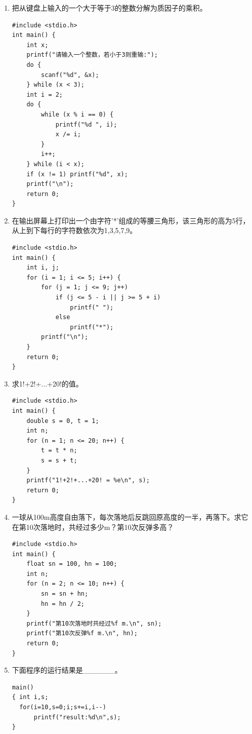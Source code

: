 \documentclass[a4paper,12pt]{article}
\begin{document}
\begin{enumerate}
	\item 把从键盘上输入的一个大于等于3的整数分解为质因子的乘积。
	      \begin{verbatim}
#include <stdio.h>
int main() {
    int x;
    printf("请输入一个整数，若小于3则重输:");
    do {
        scanf("%d", &x);
    } while (x < 3);
    int i = 2;
    do {
        while (x % i == 0) {
            printf("%d ", i);
            x /= i;
        }
        i++;
    } while (i < x);
    if (x != 1) printf("%d", x);
    printf("\n");
    return 0;
}
    \end{verbatim}
	      \vspace{0.3cm}

	\item 在输出屏幕上打印出一个由字符'*'组成的等腰三角形，该三角形的高为5行，从上到下每行的字符数依次为1,3,5,7,9。
	      \begin{verbatim}
#include <stdio.h>
int main() {
    int i, j;
    for (i = 1; i <= 5; i++) {
        for (j = 1; j <= 9; j++)
            if (j <= 5 - i || j >= 5 + i)
                printf(" ");
            else
                printf("*");
        printf("\n");
    }
    return 0;
}
    \end{verbatim}
	      \vspace{0.3cm}

	\item 求1!+2!+...+20!的值。
	      \begin{verbatim}
#include <stdio.h>
int main() {
    double s = 0, t = 1;
    int n;
    for (n = 1; n <= 20; n++) {
        t = t * n;
        s = s + t;
    }
    printf("1!+2!+...+20! = %e\n", s);
    return 0;
}
    \end{verbatim}
	      \vspace{0.3cm}

	\item 一球从100m高度自由落下，每次落地后反跳回原高度的一半，再落下。求它在第10次落地时，共经过多少m？第10次反弹多高？
	      \begin{verbatim}
#include <stdio.h>
int main() {
    float sn = 100, hn = 100;
    int n;
    for (n = 2; n <= 10; n++) {
        sn = sn + hn;
        hn = hn / 2;
    }
    printf("第10次落地时共经过%f m.\n", sn);
    printf("第10次反弹%f m.\n", hn);
    return 0;
}
    \end{verbatim}
	      \vspace{0.3cm}

	\item 下面程序的运行结果是\_\_\_\_\_\_。
	      \begin{verbatim}
main()
{ int i,s;
  for(i=10,s=0;i;s+=i,i--)
      printf("result:%d\n",s);
}
    \end{verbatim}
	      \vspace{0.3cm}


\end{enumerate}
\end{document}
